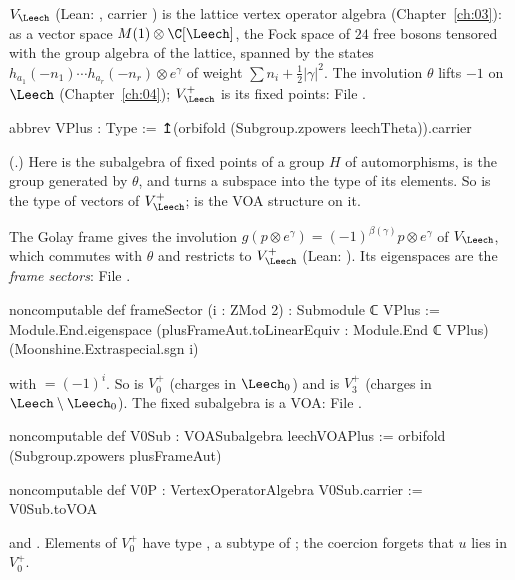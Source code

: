 $V_\Leech$ (Lean: , carrier ) is the lattice vertex operator
algebra (Chapter~\ref{ch:03}): as a vector space $M(1)\otimes\C[\Leech]$, the Fock space of $24$ free
bosons tensored with the group algebra of the lattice, spanned by the states
$h_{a_1}(-n_1)\cdots h_{a_r}(-n_r)\otimes e^\gamma$ of weight $\sum n_i+\tfrac12|\gamma|^2$.  The
involution $\theta$ lifts $-1$ on $\Leech$ (Chapter~\ref{ch:04}); $V_\Leech^+$ is its fixed points:
File .
\begin{leancode}
abbrev VPlus : Type := ↥(orbifold (Subgroup.zpowers leechTheta)).carrier
\end{leancode}
(.)  Here  is the subalgebra of fixed points
of a group $H$ of automorphisms,  is the group generated by $\theta$,
and  turns a subspace into the type of its elements.  So  is the type of vectors of
$V_\Leech^+$;  is the VOA structure on it.

The Golay frame gives the involution $g(p\otimes e^\gamma)=(-1)^{\beta(\gamma)}p\otimes e^\gamma$ of
$V_\Leech$, which commutes with $\theta$ and restricts to $V_\Leech^+$ (Lean: ).
Its eigenspaces are the \emph{frame sectors}:
File .
\begin{leancode}
noncomputable def frameSector (i : ZMod 2) : Submodule ℂ VPlus :=
  Module.End.eigenspace (plusFrameAut.toLinearEquiv : Module.End ℂ VPlus)
    (Moonshine.Extraspecial.sgn i)
\end{leancode}
with  $=(-1)^i$.  So  is $V_0^+$ (charges in
$\Leech_0$) and  is $V_3^+$ (charges in $\Leech\setminus\Leech_0$).  The fixed
subalgebra is a VOA:
File .
\begin{leancode}
noncomputable def V0Sub : VOASubalgebra leechVOAPlus := orbifold (Subgroup.zpowers plusFrameAut)

noncomputable def V0P : VertexOperatorAlgebra V0Sub.carrier := V0Sub.toVOA
\end{leancode}
and .  Elements of $V_0^+$ have type
, a subtype of ; the coercion  forgets that $u$ lies
in $V_0^+$.

